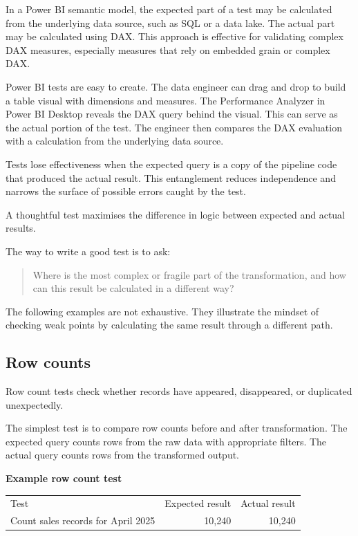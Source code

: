 \documentclass[10pt,openany,10pt]{book}
\newcounter{none}
\let\podeToprule\toprule
\let\podeMidrule\midrule
\let\podeBottomrule\bottomrule
\renewcommand{\toprule}{\arrayrulecolor{pbiGrid}\podeToprule}
\renewcommand{\midrule}{\arrayrulecolor{pbiGrid}\podeMidrule}
\renewcommand{\bottomrule}{\arrayrulecolor{pbiGrid}\podeBottomrule}
\begin{document}
In a Power BI semantic model, the expected part of a test may be
calculated from the underlying data source, such as SQL or a data lake.
The actual part may be calculated using DAX. This approach is effective
for validating complex DAX measures, especially measures that rely on
embedded grain or complex DAX.

Power BI tests are easy to create. The data engineer can drag and drop
to build a table visual with dimensions and measures. The Performance
Analyzer in Power BI Desktop reveals the DAX query behind the visual.
This can serve as the actual portion of the test. The engineer then
compares the DAX evaluation with a calculation from the underlying data
source.

Tests lose effectiveness when the expected query is a copy of the
pipeline code that produced the actual result. This entanglement reduces
independence and narrows the surface of possible errors caught by the
test.

A thoughtful test maximises the difference in logic between expected and
actual results.

The way to write a good test is to ask:

\begin{quote}
Where is the most complex or fragile part of the transformation, and how
can this result be calculated in a different way?
\end{quote}

The following examples are not exhaustive. They illustrate the mindset
of checking weak points by calculating the same result through a
different path.

\subsection{Row counts}\label{row-counts}

Row count tests check whether records have appeared, disappeared, or
duplicated unexpectedly.

The simplest test is to compare row counts before and after
transformation. The expected query counts rows from the raw data with
appropriate filters. The actual query counts rows from the transformed
output.

\textbf{Example row count test}

{\def\LTcaptype{none} %
\begin{longtable}[]{@{}lrr@{}}
\toprule\noalign{}
Test & Expected result & Actual result \\
\midrule\noalign{}
\endhead
\bottomrule\noalign{}
\endlastfoot
Count sales records for April 2025 & 10,240 & 10,240 \\
\end{longtable}
}
\end{document}
